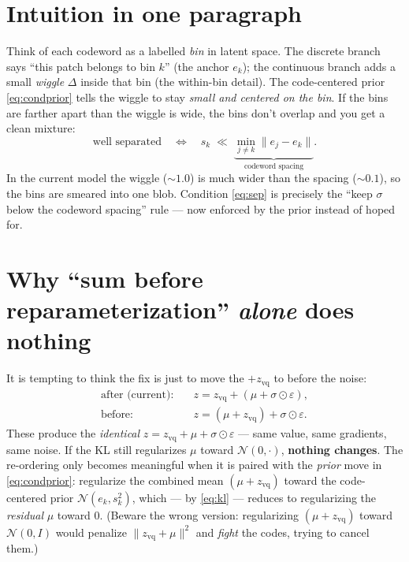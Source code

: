 \documentclass[11pt]{article}
\newcommand{\N}{\mathcal{N}}
\newcommand{\zvq}{z_{\text{vq}}}
\begin{document}
\section{Intuition in one paragraph}
Think of each codeword as a labelled \emph{bin} in latent space. The discrete branch says
``this patch belongs to bin $k$'' (the anchor $e_k$); the continuous branch adds a small
\emph{wiggle} $\Delta$ inside that bin (the within-bin detail). The code-centered prior
\eqref{eq:condprior} tells the wiggle to stay \emph{small and centered on the bin}. If the bins
are farther apart than the wiggle is wide, the bins don't overlap and you get a clean mixture:
\begin{equation}
\text{well separated} \quad\Longleftrightarrow\quad
s_k \;\ll\; \underbrace{\min_{j\neq k}\lVert e_j-e_k\rVert}_{\text{codeword spacing}} .
\label{eq:sep}
\end{equation}
In the current model the wiggle ($\sim\!1.0$) is much wider than the spacing ($\sim\!0.1$), so
the bins are smeared into one blob. Condition \eqref{eq:sep} is precisely the ``keep $\sigma$
below the codeword spacing'' rule --- now enforced by the prior instead of hoped for.

\section{Why ``sum before reparameterization'' \emph{alone} does nothing}
It is tempting to think the fix is just to move the $+\zvq$ to before the noise:
\begin{align}
\text{after (current):}\quad & z = \zvq + (\mu + \sigma\odot\varepsilon),\\
\text{before:}\quad & z = (\mu + \zvq) + \sigma\odot\varepsilon .
\end{align}
These produce the \emph{identical} $z=\zvq+\mu+\sigma\odot\varepsilon$ --- same value, same
gradients, same noise. If the KL still regularizes $\mu$ toward $\N(0,\cdot)$, \textbf{nothing
changes}. The re-ordering only becomes meaningful when it is paired with the \emph{prior} move
in \eqref{eq:condprior}: regularize the combined mean $(\mu+\zvq)$ toward the code-centered
prior $\N(e_k,s_k^2)$, which --- by \eqref{eq:kl} --- reduces to regularizing the \emph{residual}
$\mu$ toward $0$. (Beware the wrong version: regularizing $(\mu+\zvq)$ toward $\N(0,I)$ would
penalize $\lVert\zvq+\mu\rVert^2$ and \emph{fight} the codes, trying to cancel them.)
\end{document}

